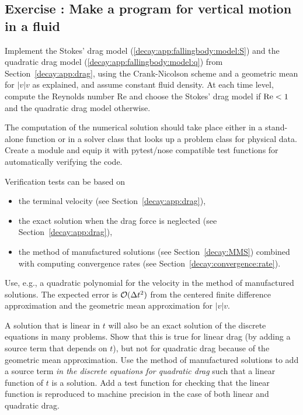 \documentclass[%
oneside,                 %
final,                   %
10pt]{article}
\newenvironment{doconceexercise}{}{}
\newcounter{doconceexercisecounter}
\begin{document}
\begin{doconceexercise}

\subsection*{Exercise \thedoconceexercisecounter: Make a program for vertical motion in a fluid}

\label{decay:app:exer:drag:prog}

Implement the Stokes' drag model (\ref{decay:app:fallingbody:model:S})
and the quadratic drag model (\ref{decay:app:fallingbody:model:q}) from
Section~\ref{decay:app:drag}, using the Crank-Nicolson
scheme and a geometric mean for $|v|v$ as explained, and assume
constant fluid density.
At each time level, compute the Reynolds number
Re and choose the Stokes' drag model if $\hbox{Re} < 1$ and the
quadratic drag model otherwise.

The computation of the numerical solution should take place either in
a stand-alone function or in a solver class that looks up a problem
class for physical data. Create a module and equip it with pytest/nose
compatible test functions for automatically verifying the code.

Verification tests can be based on

\begin{itemize}
 \item the terminal velocity (see Section~\ref{decay:app:drag}),

 \item the exact solution when the drag force is neglected
   (see Section~\ref{decay:app:drag}),

 \item the method of manufactured solutions (see Section~\ref{decay:MMS})
   combined with computing
   convergence rates (see Section~\ref{decay:convergence:rate}).
\end{itemize}

\noindent
Use, e.g., a quadratic polynomial for the velocity in the method of
manufactured solutions. The expected error is $\Oof{\Delta t^2}$
from the centered finite difference approximation and the geometric
mean approximation for $|v|v$.

A solution that is linear in $t$ will also be an exact solution of the
discrete equations in many problems.  Show that this is true for
linear drag (by adding a source term that depends on $t$), but not
for quadratic drag because of the geometric mean approximation.  Use
the method of manufactured solutions to add a source term \emph{in the
discrete equations for quadratic drag} such that a linear function of
$t$ is a solution. Add a test function for checking that the linear
function is reproduced to machine precision in the case of both linear
and quadratic drag.


\end{doconceexercise}
\end{document}
